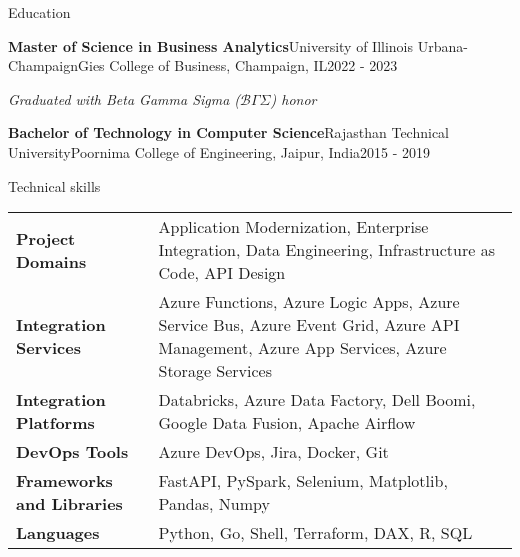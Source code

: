 \documentclass{resume} %
\makeatletter
\newcommand{\italicitem}[1]{\item{\textit{#1}}}
\newcommand{\entry}[2]{#1 & #2 \tabularnewline} %
\newcommand{\tableEnv}[2]{%
    \begin{rSection}{#1} %
        \begin{adjustwidth}{0.0in}{0.1in} %
            \begin{tabularx}{\linewidth}{@{} >{\bfseries}l @{\hspace{6ex}} X @{}}
                #2 %
            \end{tabularx}
        \end{adjustwidth}
    \end{rSection}
}
\makeatother
\begin{document}
    
    
    \begin{rSection}{Education}
        
        \begin{rSubsectionNoBullet}{\bf Master of Science in Business Analytics}{University of Illinois Urbana-Champaign}{Gies College of Business, Champaign, IL}{2022 - 2023}
            \italicitem{Graduated with Beta Gamma Sigma ($\mathcal{B}\Gamma\Sigma$) honor }
        \end{rSubsectionNoBullet}
        
        \begin{rSubsectionNoBullet}{\bf Bachelor of Technology in Computer Science}{Rajasthan Technical University}{Poornima College of Engineering, Jaipur, India}{2015 - 2019}
            \italicitem{}
        \end{rSubsectionNoBullet}
        
    \end{rSection}
    
    \newpage
    
    \tableEnv{Technical skills}{
        \entry{Project Domains}{Application Modernization, Enterprise Integration, Data Engineering, Infrastructure as Code, API Design}
        \entry{Integration Services}{Azure Functions, Azure Logic Apps, Azure Service Bus, Azure Event Grid, Azure API Management, Azure App Services, Azure Storage Services}
        \entry{Integration Platforms}{Databricks, Azure Data Factory, Dell Boomi, Google Data Fusion, Apache Airflow}
        \entry{DevOps Tools}{Azure DevOps, Jira, Docker, Git}
        \entry{Frameworks and Libraries}{FastAPI, PySpark, Selenium, Matplotlib, Pandas, Numpy}
        \entry{Languages}{Python, Go, Shell, Terraform, DAX, R, SQL}
    }
    
    
\end{document}
